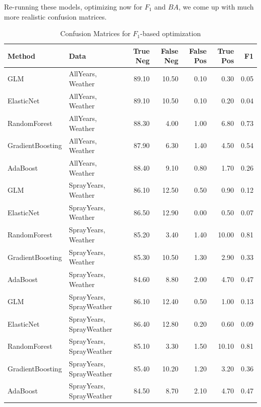 \documentclass[12pt]{article}
\begin{document}
Re-running these models, optimizing now for $F_1$ and $BA$, we come up with much more realistic confusion matrices. 
\begin{table}[H] \center \footnotesize
\begin{tabular}{|ll|rrrrr|} \hline
Method & Data & True Neg & False Neg & False Pos & True Pos & F1 \\ \hline
GLM & AllYears, Weather & 89.10 & 10.50 & 0.10 & 0.30 & 0.05 \\ 
  ElasticNet & AllYears, Weather & 89.10 & 10.50 & 0.10 & 0.20 & 0.04 \\ 
  RandomForest & AllYears, Weather & 88.30 & 4.00 & 1.00 & 6.80 & 0.73 \\ 
  GradientBoosting & AllYears, Weather & 87.90 & 6.30 & 1.40 & 4.50 & 0.54 \\ 
  AdaBoost & AllYears, Weather & 88.40 & 9.10 & 0.80 & 1.70 & 0.26 \\ 
  GLM & SprayYears, Weather & 86.10 & 12.50 & 0.50 & 0.90 & 0.12 \\ 
  ElasticNet & SprayYears, Weather & 86.50 & 12.90 & 0.00 & 0.50 & 0.07 \\ 
  RandomForest & SprayYears, Weather & 85.20 & 3.40 & 1.40 & 10.00 & 0.81 \\ 
  GradientBoosting & SprayYears, Weather & 85.30 & 10.50 & 1.30 & 2.90 & 0.33 \\ 
  AdaBoost & SprayYears, Weather & 84.60 & 8.80 & 2.00 & 4.70 & 0.47 \\ 
  GLM & SprayYears, SprayWeather & 86.10 & 12.40 & 0.50 & 1.00 & 0.13 \\ 
  ElasticNet & SprayYears, SprayWeather & 86.40 & 12.80 & 0.20 & 0.60 & 0.09 \\ 
  RandomForest & SprayYears, SprayWeather & 85.10 & 3.30 & 1.50 & 10.10 & 0.81 \\ 
  GradientBoosting & SprayYears, SprayWeather & 85.40 & 10.20 & 1.20 & 3.20 & 0.36 \\ 
  AdaBoost & SprayYears, SprayWeather & 84.50 & 8.70 & 2.10 & 4.70 & 0.47 \\ \hline
\end{tabular}
\caption*{Confusion Matrices for $F_1$-based optimization}
\end{table}
\end{document}
